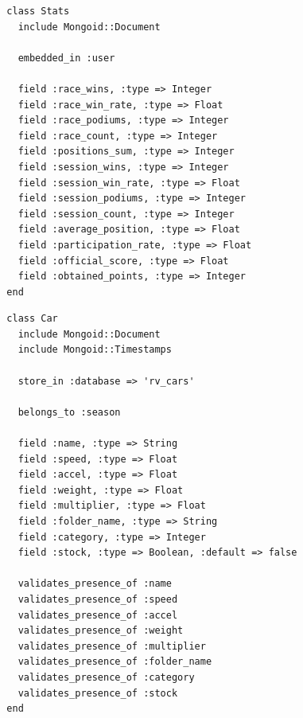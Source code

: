 \begin{listing}
  \begin{verbatim}
  class Stats
    include Mongoid::Document
    
    embedded_in :user
    
    field :race_wins, :type => Integer
    field :race_win_rate, :type => Float
    field :race_podiums, :type => Integer
    field :race_count, :type => Integer
    field :positions_sum, :type => Integer
    field :session_wins, :type => Integer
    field :session_win_rate, :type => Float
    field :session_podiums, :type => Integer
    field :session_count, :type => Integer
    field :average_position, :type => Float
    field :participation_rate, :type => Float
    field :official_score, :type => Float
    field :obtained_points, :type => Integer
  end
  \end{verbatim}
\end{listing}

\begin{listing}
  \begin{verbatim}
  class Car
    include Mongoid::Document
    include Mongoid::Timestamps
    
    store_in :database => 'rv_cars'
    
    belongs_to :season
    
    field :name, :type => String
    field :speed, :type => Float
    field :accel, :type => Float
    field :weight, :type => Float
    field :multiplier, :type => Float
    field :folder_name, :type => String
    field :category, :type => Integer
    field :stock, :type => Boolean, :default => false
    
    validates_presence_of :name
    validates_presence_of :speed
    validates_presence_of :accel
    validates_presence_of :weight
    validates_presence_of :multiplier
    validates_presence_of :folder_name
    validates_presence_of :category
    validates_presence_of :stock
  end
  \end{verbatim}
\end{listing}

